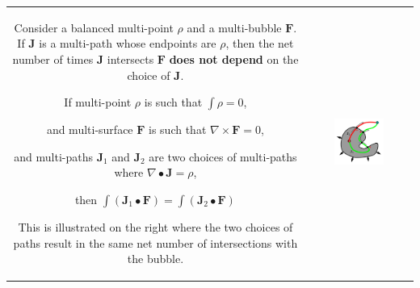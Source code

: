 \begin{tabular}{cc}
\parbox{0.5\textwidth}{
Consider a balanced multi-point \(\rho\) and a multi-bubble \(\mathbf{F}\). If \(\mathbf{J}\) is a multi-path whose endpoints are \(\rho\), then the net number of times \(\mathbf{J}\) intersects \(\mathbf{F}\) {\bf does not depend} on the choice of \(\mathbf{J}\). 

\begin{thm}\label{thm:different_paths_same_result}
If multi-point \(\rho\) is such that \(\int \rho = 0\), 

and multi-surface \(\mathbf{F}\) is such that \(\nabla \times \mathbf{F} = 0\), 

and multi-paths \(\mathbf{J}_1\) and \(\mathbf{J}_2\) are two choices  
of multi-paths where \(\nabla \bullet \mathbf{J} = \rho\), 

then \(\int (\mathbf{J}_1 \bullet \mathbf{F}) = \int (\mathbf{J}_2 \bullet \mathbf{F})\)
\end{thm}

This is illustrated on the right where the two choices of paths result in the same net number of intersections with the bubble.
} & \parbox{0.5\textwidth}{
\includegraphics[width = 0.5\textwidth]{Intersections/Path-surface_intersections/closed_surface_and_different_paths}
}
\end{tabular}



